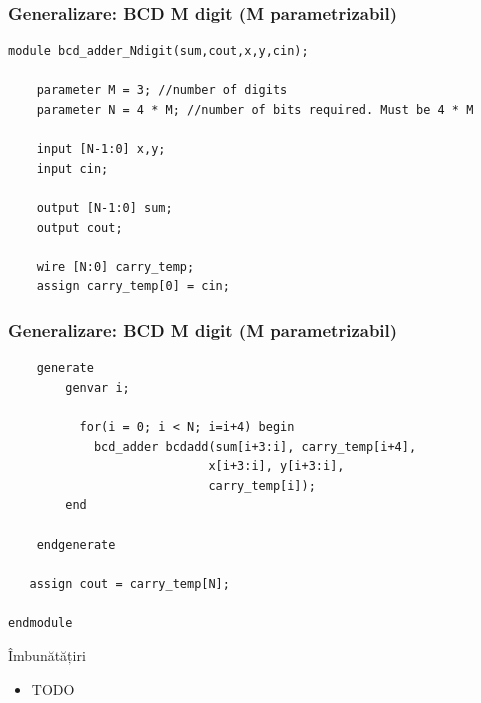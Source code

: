 \documentclass{beamer}
\begin{document}
\begin{frame}[fragile]\frametitle{Generalizare: BCD M digit (M parametrizabil)}

\begin{verbatim}
module bcd_adder_Ndigit(sum,cout,x,y,cin);
	
    parameter M = 3; //number of digits
    parameter N = 4 * M; //number of bits required. Must be 4 * M

	input [N-1:0] x,y;
	input cin;
	
	output [N-1:0] sum;
	output cout;

	wire [N:0] carry_temp;
    assign carry_temp[0] = cin;

\end{verbatim}

\end{frame}

\begin{frame}[fragile]\frametitle{Generalizare: BCD M digit (M parametrizabil)}

\begin{verbatim}
    generate
        genvar i;

    	  for(i = 0; i < N; i=i+4) begin
            bcd_adder bcdadd(sum[i+3:i], carry_temp[i+4],
							x[i+3:i], y[i+3:i],
							carry_temp[i]);    
        end

    endgenerate

   assign cout = carry_temp[N];

endmodule
\end{verbatim}

\end{frame}



\begin{frame}{Îmbunătățiri}

\begin{itemize}
\item TODO
\end{itemize}
\end{frame}
\end{document}
